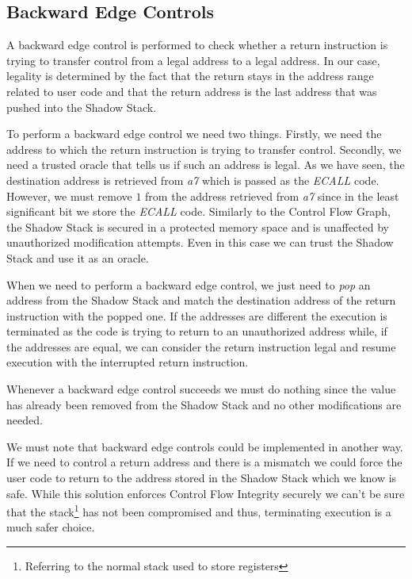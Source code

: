 \subsection{Backward Edge Controls}
\label{subsec:backward}

A backward edge control is performed to check whether a return instruction is
trying to transfer control from a legal address to a legal address. In our case,
legality is determined by the fact that the return stays in the address range
related to user code and that the return address is the last address that was
pushed into the Shadow Stack.

To perform a backward edge control we need two things. Firstly, we need the
address to which the return instruction is trying to transfer control. Secondly,
we need a trusted oracle that tells us if such an address is legal. As we have seen,
the destination address is retrieved from \textit{a7} which is passed as the \textit{ECALL}
code. However, we must remove $1$ from the address retrieved from \textit{a7} since
in the least significant bit we store the \textit{ECALL} code. Similarly to the Control
Flow Graph, the Shadow Stack is secured in a protected memory space and is
unaffected by unauthorized modification attempts. Even in this case we can trust
the Shadow Stack and use it as an oracle.

When we need to perform a backward edge control, we just need to \textit{pop} an
address from the Shadow Stack and match the destination address of the return instruction
with the popped one. If the addresses are different the execution is terminated
as the code is trying to return to an unauthorized address while, if the addresses
are equal, we can consider the return instruction legal and resume execution
with the interrupted return instruction.

Whenever a backward edge control succeeds we must do nothing since the value has
already been removed from the Shadow Stack and no other modifications are needed.

We must note that backward edge controls could be implemented in another way. If
we need to control a return address and there is a mismatch we could force the user
code to return to the address stored in the Shadow Stack which we know is safe.
While this solution enforces Control Flow Integrity securely we can't be sure
that the stack\footnote{Referring to the normal stack used to store registers} has
not been compromised and thus, terminating execution is a much safer choice.

